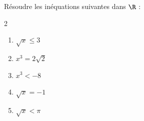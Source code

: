 \begin{exo}{}
	Résoudre les inéquations suivantes dans $\R$ :
	\vspace*{-2mm}
	\begin{multicols}{2}
	\begin{enumerate}[itemsep=2mm]
		\item $\sqrt{x} \le 3$
		\item $x^3 = 2\sqrt{2}$
		\item $x^3 < -8$
		\item $\sqrt{x} = -1$
		\item $\sqrt{x} < \pi$
	\end{enumerate}
	\end{multicols}\vspace*{-2mm}
\end{exo}

